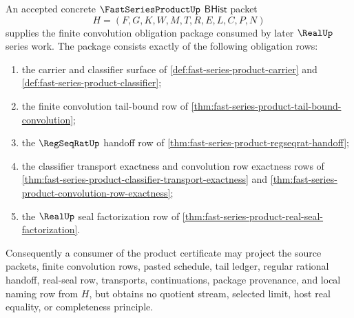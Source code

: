 \begin{theorem}
\label{thm:fast-series-product-finite-convolution-obligation-package}
An accepted concrete $\FastSeriesProductUp$ $\mathsf{BHist}$ packet
$$
H=(F,G,K,W,M,T,R,E,L,C,P,N)
$$
supplies the finite convolution obligation package consumed by later $\RealUp$ series work. The package consists exactly of the following obligation rows:
\begin{enumerate}
\item the carrier and classifier surface of \autoref{def:fast-series-product-carrier} and \autoref{def:fast-series-product-classifier};
\item the finite convolution tail-bound row of \autoref{thm:fast-series-product-tail-bound-convolution};
\item the $\RegSeqRatUp$ handoff row of \autoref{thm:fast-series-product-regseqrat-handoff};
\item the classifier transport exactness and convolution row exactness rows of \autoref{thm:fast-series-product-classifier-transport-exactness} and \autoref{thm:fast-series-product-convolution-row-exactness};
\item the $\RealUp$ seal factorization row of \autoref{thm:fast-series-product-real-seal-factorization}.
\end{enumerate}
Consequently a consumer of the product certificate may project the source packets, finite convolution rows, pasted schedule, tail ledger, regular rational handoff, real-seal row, transports, continuations, package provenance, and local naming row from $H$, but obtains no quotient stream, selected limit, host real equality, or completeness principle.
\end{theorem}
